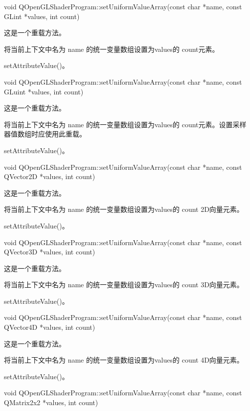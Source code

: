 void QOpenGLShaderProgram::setUniformValueArray(const char *name, const GLint *values, int count)

这是一个重载方法。

将当前上下文中名为 name 的统一变量数组设置为values的 count元素。


\begin{seeAlso}
setAttributeValue()。
\end{seeAlso}

void QOpenGLShaderProgram::setUniformValueArray(const char *name, const GLuint *values, int count)

这是一个重载方法。

将当前上下文中名为 name 的统一变量数组设置为values的 count元素。设置采样器值数组时应使用此重载。

\begin{seeAlso}
setAttributeValue()。
\end{seeAlso}

void QOpenGLShaderProgram::setUniformValueArray(const char *name, const QVector2D *values, int count)

这是一个重载方法。

将当前上下文中名为 name 的统一变量数组设置为values的 count 2D向量元素。


\begin{seeAlso}
setAttributeValue()。
\end{seeAlso}

void QOpenGLShaderProgram::setUniformValueArray(const char *name, const QVector3D *values, int count)

这是一个重载方法。

将当前上下文中名为 name 的统一变量数组设置为values的 count 3D向量元素。

\begin{seeAlso}
setAttributeValue()。
\end{seeAlso}

void QOpenGLShaderProgram::setUniformValueArray(const char *name, const QVector4D *values, int count)

这是一个重载方法。

将当前上下文中名为 name 的统一变量数组设置为values的 count 4D向量元素。

\begin{seeAlso}
setAttributeValue()。
\end{seeAlso}

void QOpenGLShaderProgram::setUniformValueArray(const char *name, const QMatrix2x2 *values, int count)

